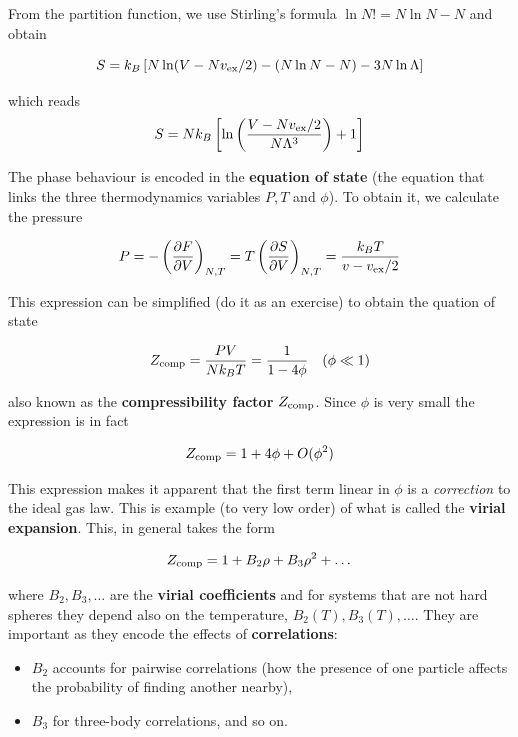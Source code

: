 \documentclass[
  letterpaper,
  enabledeprecatedfontcommands]{report}
\providecommand{\tightlist}{%
  \setlength{\itemsep}{0pt}\setlength{\parskip}{0pt}}
\begin{document}
From the partition function, we use Stirling's formula
\(\ln N! = N\ln N -N\) and obtain

\[
S = k_B \left[ N \ln(V - N v_{\rm ex}/2) - (N \ln N - N) - 3N \ln \Lambda \right]
\]

which reads \[
S = N k_B \left[ \ln\left( \frac{V - N v_{\rm ex}/2}{N \Lambda^3} \right) + 1 \right]
\]

The phase behaviour is encoded in the \textbf{equation of state} (the
equation that links the three thermodynamics variables \(P,T\) and
\(\phi\)). To obtain it, we calculate the pressure

\[P = -\left(\dfrac{\partial F}{\partial V}\right)_{N,T} =T\left(\dfrac{\partial S}{\partial V}\right)_{N,T}= \dfrac{k_B T }{v-v_{\rm ex}/2}\]

This expression can be simplified (do it as an exercise) to obtain the
quation of state

\[Z_{\rm comp}= \dfrac{PV}{Nk_BT}=\dfrac{1}{1-4\phi} \quad (\phi\ll 1)\]

also known as the \textbf{compressibility factor} \(Z_{\rm comp}\).
Since \(\phi\) is very small the expression is in fact


\[Z_{\rm comp} = 1+4\phi+O(\phi^2)\]

This expression makes it apparent that the first term linear in \(\phi\)
is a \emph{correction} to the ideal gas law. This is example (to very
low order) of what is called the \textbf{virial expansion}. This, in
general takes the form

\[Z_{\rm comp}= 1 + B_2 \rho + B_3 \rho^2+ \dots\]

where \(B_2, B_3, \dots\) are the \textbf{virial coefficients} and for
systems that are not hard spheres they depend also on the temperature,
\(B_2(T), B_3(T),\dots\). They are important as they encode the effects
of \textbf{correlations}:

\begin{itemize}
\tightlist
\item
  \(B_2\) accounts for pairwise correlations (how the presence of one
  particle affects the probability of finding another nearby),
\item
  \(B_3\) for three-body correlations, and so on.
\end{itemize}
\end{document}
